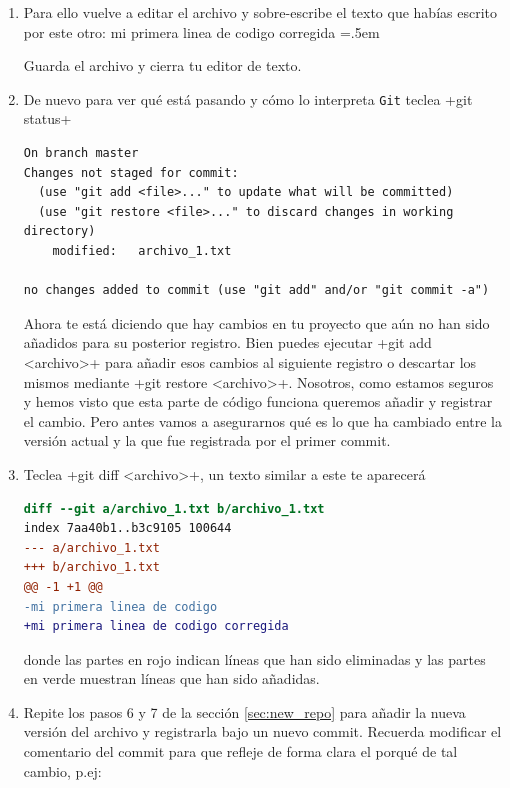 \documentclass[a5paper,10pt]{article}
\newenvironment{cverbatim}
 {\SaveVerbatim{cverb}}
 {\endSaveVerbatim
  \flushleft\fboxrule=0pt\fboxsep=.5em
  \colorbox{bg}{\BUseVerbatim{cverb}}%
  \endflushleft
}
\begin{document}
    \begin{enumerate}
    \item Para ello vuelve a editar el archivo y sobre-escribe el texto que habías escrito por este otro:
    \begin{cverbatim}
mi primera linea de codigo corregida
    \end{cverbatim}
    
    Guarda el archivo y cierra tu editor de texto.
      
    \item De nuevo para ver qué está pasando y cómo lo interpreta \verb+Git+ teclea \cverb+git status+
    
    \begin{lstlisting}[style=custom]
On branch master
Changes not staged for commit:
  (use "git add <file>..." to update what will be committed)
  (use "git restore <file>..." to discard changes in working directory)
	modified:   archivo_1.txt

no changes added to commit (use "git add" and/or "git commit -a")
    \end{lstlisting}
    
    Ahora te está diciendo que hay cambios en tu proyecto que aún no han sido añadidos para su posterior registro. Bien puedes ejecutar \cverb+git add <archivo>+ para añadir esos cambios al siguiente registro o descartar los mismos mediante \cverb+git restore <archivo>+. Nosotros, como estamos seguros y hemos visto que esta parte de código funciona queremos añadir y registrar el cambio. Pero antes vamos a asegurarnos qué es lo que ha cambiado entre la versión actual y la que fue registrada por el primer commit. 
    
    \item Teclea \cverb+git diff <archivo>+, un texto similar a este te aparecerá
    
    \begin{lstlisting}[style=custom, language=diff]
diff --git a/archivo_1.txt b/archivo_1.txt
index 7aa40b1..b3c9105 100644
--- a/archivo_1.txt
+++ b/archivo_1.txt
@@ -1 +1 @@
-mi primera linea de codigo
+mi primera linea de codigo corregida
    \end{lstlisting}
    donde las partes en rojo indican líneas que han sido eliminadas y las partes en verde muestran líneas que han sido añadidas.
    
    \item Repite los pasos 6 y 7 de la sección \ref{sec:new_repo} para añadir la nueva versión del archivo y registrarla bajo un nuevo commit. Recuerda modificar el comentario del commit para que refleje de forma clara el porqué de tal cambio, p.ej: 
    

\end{enumerate}
\end{document}
